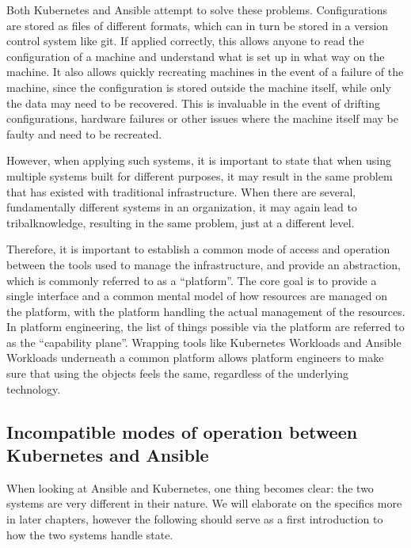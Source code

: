 Both Kubernetes and Ansible attempt to solve these problems.
Configurations are stored as files of different formats, which can in turn be stored in a version control system like git.
If applied correctly, this allows anyone to read the configuration of a machine and understand what is set up in what way on the machine.
It also allows quickly recreating machines in the event of a failure of the machine, since the configuration is stored outside the machine itself, while only the data may need to be recovered.
This is invaluable in the event of drifting configurations, hardware failures or other issues where the machine itself may be faulty and need to be recreated.
\parencite{platformengineering-architects, poulton2025kubernetes}

However, when applying such systems, it is important to state that when using multiple systems built for different purposes, it may result in the same problem that has existed with traditional infrastructure.
When there are several, fundamentally different systems in an organization, it may again lead to \gls{tribalknowledge}, resulting in the same problem, just at a different level.
\parencite{platformengineering-architects}

Therefore, it is important to establish a common mode of access and operation between the tools used to manage the infrastructure, and provide an abstraction, which is commonly referred to as a \enquote{platform}.
The core goal is to provide a single interface and a common mental model of how resources are managed on the platform, with the platform handling the actual management of the resources.
In platform engineering, the list of things possible via the platform are referred to as the \enquote{capability plane}.
Wrapping tools like Kubernetes Workloads and Ansible Workloads underneath a common platform allows platform engineers to make sure that using the objects feels the same, regardless of the underlying technology.
\parencite{platformengineering-architects}

\subsection{Incompatible modes of operation between Kubernetes and Ansible}
When looking at Ansible and Kubernetes, one thing becomes clear: the two systems are very different in their nature.
We will elaborate on the specifics more in later chapters, however the following should serve as a first introduction to how the two systems handle state.

